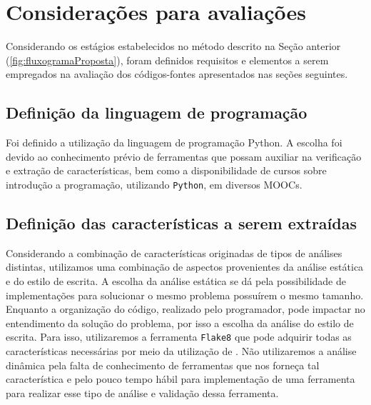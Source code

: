 	\section{Considerações para avaliações}

		
		Considerando os estágios estabelecidos no método descrito na Seção anterior
		(\ref{fig:fluxogramaProposta}), foram definidos requisitos e elementos a serem
		empregados na avaliação dos códigos-fontes apresentados nas seções seguintes.

		\subsection{Definição da linguagem de programação}
			Foi definido a utilização da linguagem de programação Python. A escolha foi
			devido ao conhecimento prévio de ferramentas que possam auxiliar na verificação
			e extração de características, bem como a disponibilidade de cursos sobre
			introdução a programação, utilizando \texttt{Python}, em diversos \acs{MOOC}s.

		\subsection{Definição das características a serem extraídas}
			Considerando a combinação de características originadas de tipos de análises
			distintas, utilizamos uma combinação de aspectos provenientes da análise  %
			estática e do estilo de escrita. A escolha da análise estática se dá pela
			possibilidade de implementações para solucionar o mesmo problema possuírem
			o mesmo tamanho. Enquanto a organização do código, realizado pelo programador,
			pode impactar no entendimento da solução do problema, por isso a escolha da
			análise do estilo de escrita. Para isso, utilizaremos a ferramenta \texttt{Flake8}
			\cite{flake8} que pode adquirir todas as características necessárias por meio da
			utilização de . Não utilizaremos a análise dinâmica pela falta
			de conhecimento de ferramentas que nos forneça tal característica e pelo pouco
			tempo hábil para implementação de uma ferramenta para realizar esse tipo de
			análise e validação dessa ferramenta.
			
